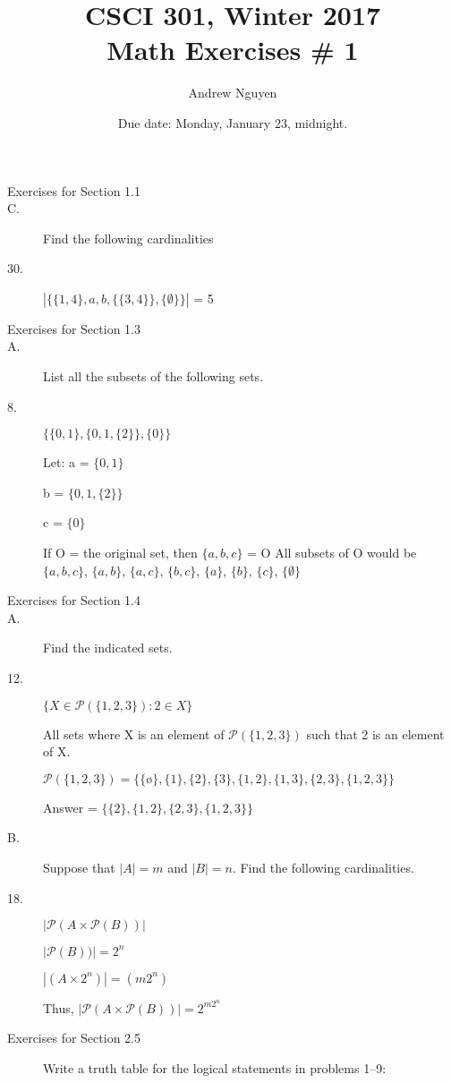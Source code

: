 \documentclass[10pt]{article}
\title{CSCI 301, Winter 2017\\Math Exercises \# 1}
\author{Andrew Nguyen}
\date{Due date:  Monday, January 23, midnight.}
\begin{document}
\maketitle


\begin{description}
\item[Exercises for Section 1.1]
\item[C.] Find the following cardinalities
\item[30.] $|\{\{1,4\},a,b,\{\{3,4\}\},\{\emptyset\}\}|$ = 5

\item[Exercises for Section 1.3]
\item[A.] List all the subsets of the following sets.
\item[8.] $\{\{0,1\},\{0,1,\{2\}\},\{0\}\}$


Let: 
a = $\{0, 1\}$ 

b = $\{0,1,\{2\}\}$ 

c = $\{0\}$

If O = the original set, then $\{a,b,c\}$ = O
All subsets of O would be $\{a,b,c\}$, $\{a,b\}$, $\{a,c\}$, $\{b,c\}$, $\{a\}$, $\{b\}$, $\{c\}$, $\{\emptyset\}$


\item[Exercises for Section 1.4]
\item[A.] Find the indicated sets.
\item[12.] $\{X\in\mathcal{P}(\{1,2,3\}):2\in X\}$

All sets where X is an element of $\mathcal{P}(\{1,2,3\})$ such that 2 is an element of X.

$\mathcal{P}(\{1,2,3\}) = \{\{ø\}, \{1\}, \{2\}, \{3\}, \{1, 2\}, \{1, 3\}, \{2, 3\}, \{1, 2, 3\}\}$

Answer = $\{\{2\}, \{1, 2\}, \{2, 3\}, \{1, 2, 3\}\}$ 

\item[B.] Suppose that $|A|=m$ and $|B|=n$.  Find the following cardinalities.
\item[18.] $|\mathcal{P}(A\times \mathcal{P}(B))|$

$|\mathcal{P}(B))| = 2^n$

$|(A\times 2^n)| = (m2^n)$

Thus, $|\mathcal{P}(A\times \mathcal{P}(B))| = 2^{m2^n}$

\item[Exercises for Section 2.5] Write a truth table for the logical
  statements in problems 1--9:


\end{description}
\end{document}
